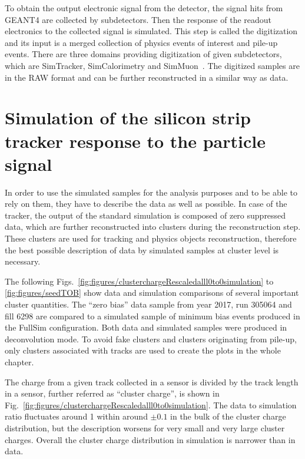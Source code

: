 To obtain the output electronic signal from the detector, the signal hits from GEANT4 are collected by subdetectors. Then the response of the readout electronics to the collected signal is simulated. This step is called the digitization and its input is a merged collection of physics events of interest and pile-up events. There are three domains providing digitization of given subdetectors, which are SimTracker, SimCalorimetry and SimMuon~\cite{website:simdigi}. The digitized samples are in the RAW format and can be further reconstructed in a similar way as data.

\newpage

\section{Simulation of the silicon strip tracker response to the particle signal~\label{sec:trackerSimu}}

In order to use the simulated samples for the analysis purposes and to be able to rely on them, they have to describe the data as well as possible. In case of the tracker, the output of the standard simulation is composed of zero suppressed data, which are further reconstructed into clusters during the reconstruction step. These clusters are used for tracking and physics objects reconstruction, therefore the best possible description of data by simulated samples at cluster level is necessary.

The following Figs.~\ref{fig:figures/clusterchargeRescaledalll0to0simulation} to \ref{fig:figures/seedTOB} show data and simulation comparisons of several important cluster quantities. The ``zero bias'' data sample from year 2017, run 305064 and fill 6298 are compared to a simulated sample of minimum bias events produced in the FullSim configuration. Both data and simulated samples were produced in deconvolution mode. To avoid fake clusters and clusters originating from pile-up, only clusters associated with tracks are used to create the plots in the whole chapter.
 
The charge from a given track collected in a sensor is divided by the track length in a sensor, further referred as ``cluster charge'', is shown in Fig.~\ref{fig:figures/clusterchargeRescaledalll0to0simulation}. The data to simulation ratio fluctuates around 1 within around $\pm 0.1$ in the bulk of the cluster charge distribution, but the description worsens for very small and very large cluster charges. Overall the cluster charge distribution in simulation is narrower than in data. 


